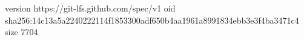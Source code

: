 version https://git-lfs.github.com/spec/v1
oid sha256:14c13a5a2240222114f1853300adf650b4aa1961a8991834ebb3e3f4ba3471c4
size 7704
